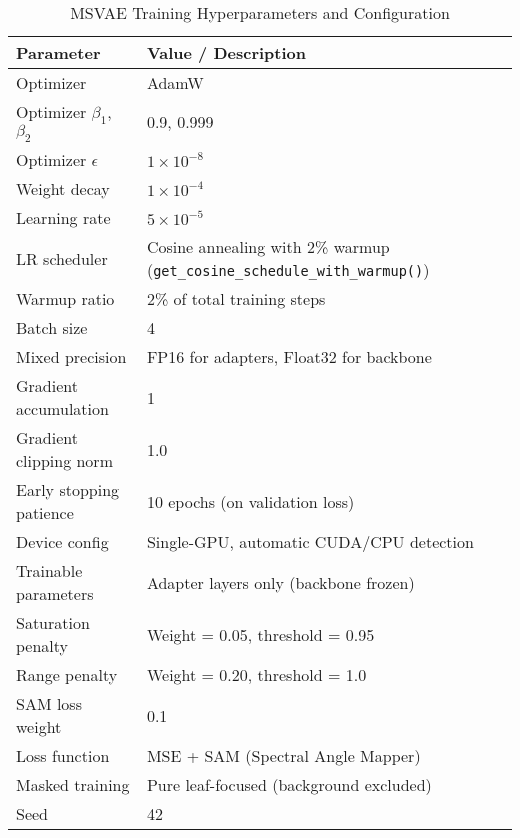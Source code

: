 \begin{table}[htbp]
  \centering
  \caption{MSVAE Training Hyperparameters and Configuration}
  \label{tab:msvae-training-hyperparams}
  \renewcommand{\arraystretch}{1.2}
  \setlength{\tabcolsep}{10pt}
  \begin{tabular}{p{5cm} p{7cm}}
    \toprule
    \textbf{Parameter} & \textbf{Value / Description} \\
    \midrule
    Optimizer & AdamW \\
    Optimizer $\beta_1$, $\beta_2$ & 0.9, 0.999 \\
    Optimizer $\epsilon$ & $1 \times 10^{-8}$ \\
    Weight decay & $1 \times 10^{-4}$ \\
    Learning rate & $5 \times 10^{-5}$ \\
    LR scheduler & Cosine annealing with 2\% warmup (\texttt{get\_cosine\_schedule\_with\_warmup()}) \\
    Warmup ratio & 2\% of total training steps \\
    Batch size & 4 \\
    Mixed precision & FP16 for adapters, Float32 for backbone \\
    Gradient accumulation & 1 \\
    Gradient clipping norm & 1.0 \\
    Early stopping patience & 10 epochs (on validation loss) \\
    Device config & Single-GPU, automatic CUDA/CPU detection \\
    Trainable parameters & Adapter layers only (backbone frozen) \\
    Saturation penalty & Weight = 0.05, threshold = 0.95 \\
    Range penalty & Weight = 0.20, threshold = 1.0 \\
    SAM loss weight & 0.1 \\
    Loss function & MSE + SAM (Spectral Angle Mapper) \\
    Masked training & Pure leaf-focused (background excluded) \\
    Seed & 42 \\
    \bottomrule
  \end{tabular}
\end{table}

